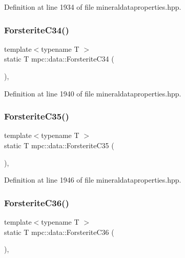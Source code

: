 Definition at line 1934 of file mineraldataproperties.\+hpp.

\mbox{\label{namespacempc_1_1data_a0c2786dc35cbbdef320a85cf6ecfd22b}} 
\subsubsection{\texorpdfstring{Forsterite\+C34()}{ForsteriteC34()}}
{\footnotesize\ttfamily template$<$typename T $>$ \\
static T mpc\+::data\+::\+Forsterite\+C34 (\begin{DoxyParamCaption}{ }\end{DoxyParamCaption})\hspace{0.3cm}{\ttfamily [inline]}, {\ttfamily [static]}}



Definition at line 1940 of file mineraldataproperties.\+hpp.

\mbox{\label{namespacempc_1_1data_a94d954891ed6bfae5879ee997a9cb4de}} 
\subsubsection{\texorpdfstring{Forsterite\+C35()}{ForsteriteC35()}}
{\footnotesize\ttfamily template$<$typename T $>$ \\
static T mpc\+::data\+::\+Forsterite\+C35 (\begin{DoxyParamCaption}{ }\end{DoxyParamCaption})\hspace{0.3cm}{\ttfamily [inline]}, {\ttfamily [static]}}



Definition at line 1946 of file mineraldataproperties.\+hpp.

\mbox{\label{namespacempc_1_1data_a861e91de6e396c3694fd7b3020d7012e}} 
\subsubsection{\texorpdfstring{Forsterite\+C36()}{ForsteriteC36()}}
{\footnotesize\ttfamily template$<$typename T $>$ \\
static T mpc\+::data\+::\+Forsterite\+C36 (\begin{DoxyParamCaption}{ }\end{DoxyParamCaption})\hspace{0.3cm}{\ttfamily [inline]}, {\ttfamily [static]}}



